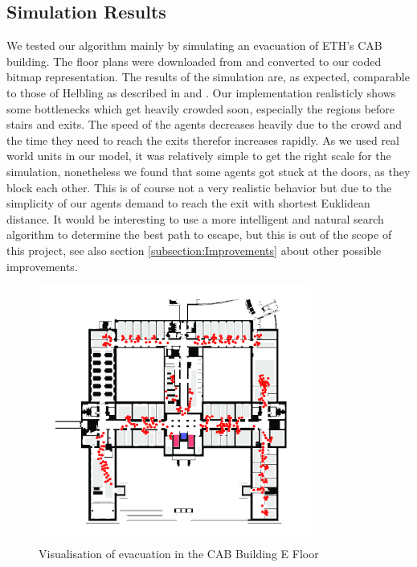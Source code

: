 \documentclass[11pt]{article}
\begin{document}
\subsection{Simulation Results}

We tested our algorithm mainly by simulating an evacuation of ETH's CAB building.
The floor plans were downloaded from \cite{ethfloors} and converted to our coded bitmap representation.
The results of the simulation are, as expected, comparable to those of Helbling as described in \cite{SFMPD} and \cite{SDFEP}.
Our implementation realisticly shows some bottlenecks which get heavily crowded soon, especially the regions before stairs and exits.
The speed of the agents decreases heavily due to the crowd and the time they need to reach the exits therefor increases rapidly.
As we used real world units in our model, it was relatively simple to get the right scale for the simulation,
nonetheless we found that some agents got stuck at the doors, as they block each other.
This is of course not a very realistic behavior but due to the simplicity of our agents demand to reach the
exit with shortest Euklidean distance. It would be interesting to use a more intelligent and natural search 
algorithm to determine the best path to escape, but this is out of the scope of this project, 
see also section \ref{subsection:Improvements} about other possible improvements.

\begin{figure}[h]
\centering
\includegraphics[width=0.8\textwidth]{./images/cab1.png}
\caption{Visualisation of evacuation in the CAB Building E Floor} 
\label{cab1}
\end{figure}
\end{document}
